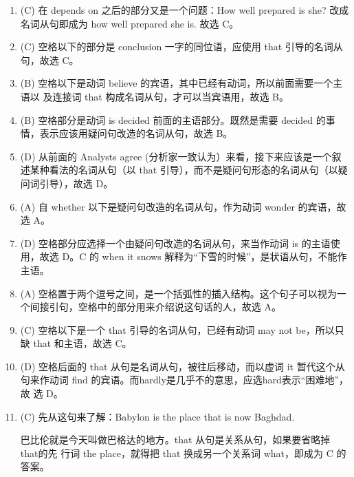 \begin{enumerate}
\item  (C) 在 depends on 之后的部分又是一个问题：How well prepared is she? 改成名词从句即成为 how well prepared she is. 故选 C。

\item (C) 空格以下的部分是 conclusion 一字的同位语，应使用 that 引导的名词从句，故选 C。

\item (B) 空格以下是动词 believe 的宾语，其中已经有动词，所以前面需要一个主语以
  及连接词 that 构成名词从句，才可以当宾语用，故选 B。
\item (B) 空格部分是动词 is decided 前面的主语部分。既然是需要 decided 的事情，表示应该用疑问句改造的名词从句，故选 B。
\item (D) 从前面的 Analysts agree (分析家一致认为）来看，接下来应该是一个叙述某种看法的名词从句（以 that 引导），而不是疑问句形态的名词从句（以疑问词引导），故选 D。

\item  (A) 自 whether 以下是疑问句改造的名词从句，作为动词 wonder 的宾语，故选 A。

\item (D) 空格部分应选择一个由疑问句改造的名词从句，来当作动词 is 的主语使用，故选 D。C 的 when it snows 解释为“下雪的时候”，是状语从句，不能作主语。

\item (A) 空格置于两个逗号之间，是一个括弧性的插入结构。这个句子可以视为一个间接引句，空格中的部分用来介绍说这句话的人，故选 A。

\item (C) 空格以下是一个 that 引导的名词从句，已经有动词 may not be，所以只缺 that 和主语，故选 C。

\item (D) 空格后面的 that 从句是名词从句，被往后移动，而以虚词 it 暂代这个从
  句来作动词 find 的宾语。而hardly是几乎不的意思，应选hard表示“困难地”，故
  选 D。

\item (C) 先从这句来了解：Babylon is the place that is now Baghdad.

  巴比伦就是今天叫做巴格达的地方。that 从句是关系从句，如果要省略掉 that的先
  行词 the place，就得把 that 换成另一个关系词 what，即成为 C 的答案。

\end{enumerate}


